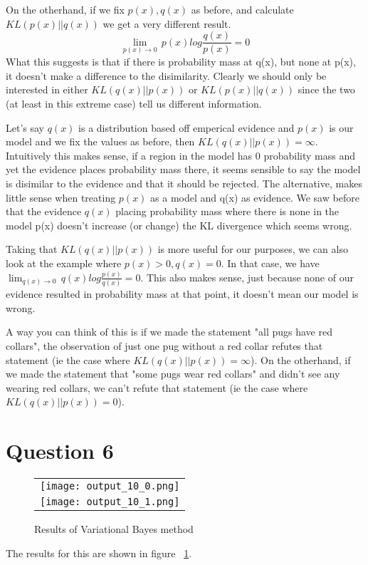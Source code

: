\documentclass[]{article}
\begin{document}
    \par On the otherhand, if we fix $p(x), q(x)$ as before, and calculate $KL(p(x)||q(x))$ we get a very different result. $$\lim_{p(x)\rightarrow 0} \, p(x) log \frac{q(x)}{p(x)} = 0$$ What this suggests is that if there is probability mass at q(x), but none at p(x), it doesn't make a difference to the disimilarity. Clearly we should only be interested in either $KL(q(x)||p(x))$ or $KL(p(x)||q(x))$ since the two (at least in this extreme case) tell us different information.
    
    \par Let's say $q(x)$ is a distribution based off emperical evidence and $p(x)$ is our model and we fix the values as before, then $KL(q(x)||p(x)) = \infty$. Intuitively this makes sense, if a region in the model has 0 probability mass and yet the evidence places probability mass there, it seems sensible to say the model is disimilar to the evidence and that it should be rejected. The alternative, makes little sense when treating $p(x)$ as a model and q(x) as evidence. We saw before that the evidence $q(x)$ placing probability mass where there is none in the model p(x) doesn't increase (or change) the KL divergence which seems wrong. 
    
    \par Taking that $KL(q(x)||p(x))$ is more useful for our purposes, we can also look at the example where $p(x)>0, q(x)=0$. In that case, we have $\lim_{q(x)\rightarrow 0} \, q(x) log \frac{p(x)}{q(x)} = 0$. This also makes sense, just because none of our evidence resulted in probability mass at that point, it doesn't mean our model is wrong. 
    
    \par A way you can think of this is if we made the statement "all pugs have red collars", the observation of just one pug without a red collar refutes that statement (ie the case where $KL(q(x)||p(x))=\infty$). On the otherhand, if we made the statement that "some pugs wear red collars" and didn't see any wearing red collars, we can't refute that statement (ie the case where $KL(q(x)||p(x))=0$). \cite{inftheory}
    
    \section*{Question 6}
        \begin{figure}[h]
            \centering
            \begin{tabular}{c}
                \texttt{[image: output\_10\_0.png]}\\
                \texttt{[image: output\_10\_1.png]}
            \end{tabular}
            \caption{Results of Variational Bayes method}
            \label{fig:q6}
        \end{figure}
        \par The results for this are shown in figure ~\ref{fig:q6}.
\end{document}
